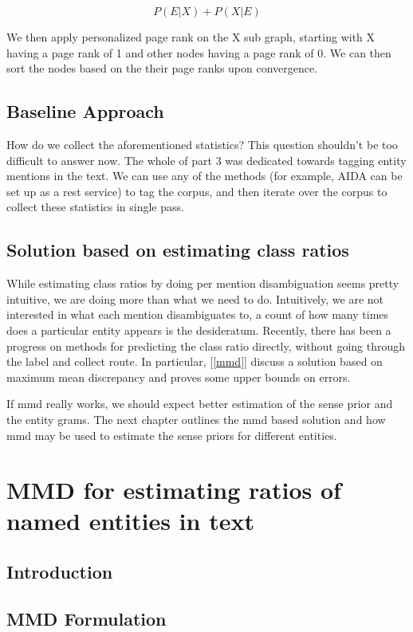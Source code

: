 \begin{equation}
\tag{3}
 P(E|X) + P(X|E) 
\end{equation}

We then apply personalized page rank on the X sub graph, starting with X having a 
page rank of 1 and other nodes having a page rank of 0. We can then sort the nodes
based on the their page ranks upon convergence. 
 


\section{Baseline Approach}
How do we collect the aforementioned statistics?
This question shouldn't be too difficult to answer now. The whole of part 3
was dedicated towards tagging entity mentions in the text. We can use any of the 
methods (for example, AIDA can be set up as a rest service) to tag the corpus, and then iterate over the corpus to collect these statistics
in single pass. 
\section{Solution based on estimating class ratios}
While estimating class ratios by doing per mention disambiguation seems pretty intuitive, we are doing more than what we need to do.
Intuitively, we are not interested in what each mention disambiguates to, a count of how many times does a particular entity appears
is the desideratum. Recently, there has been a progress on methods for predicting the class ratio directly, without going through the 
label and collect route. In particular, [\ref{mmd}] discuss a solution based on maximum mean discrepancy and proves some upper bounds 
on errors. 

If mmd really works, we should expect better estimation of the sense prior and the entity grams. The next chapter outlines the mmd based 
solution and how mmd may be used to estimate the sense priors for different entities. 

\chapter{MMD for estimating ratios of named entities in text}

\section{Introduction}

\section{MMD Formulation}

